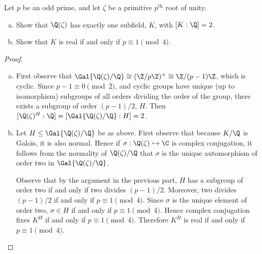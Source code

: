 \documentclass[10pt]{amsart}
\begin{document}
\begin{thm}
  Let $p$ be an odd prime, and let $\zeta$ be a primitive $p^\text{th}$ root of unity.
  \begin{enumerate}[(a)]
  \item
    Show that $\Q(\zeta)$ has exactly one subfield, $K$, with $[K : \Q] = 2$.
  \item
    Show that $K$ is real if and only if $p \equiv 1 \pmod{4}$.
  \end{enumerate}
  
  \begin{proof}
    \begin{enumerate}[(a)]
    \item
      First observe that $\Gal{\Q(\zeta)/\Q} \cong (\Z/p\Z)^\times \cong \Z/(p-1)\Z$, which is cyclic.
      Since $p - 1 \equiv 0 \pmod{2}$, and cyclic groups have unique (up to isomorphism) subgroups of all orders dividing the order of the group, there exists a subgroup of order $(p-1)/2$, $H$.
      Then $[\Q(\zeta)^H : \Q] = [\Gal{\Q(\zeta)/\Q} : H] = 2$.
    \item
      Let $H \leq \Gal{\Q(\zeta)/\Q}$ be as above.
      First observe that because $K/\Q$ is Galois, it is also normal.
      Hence if $\sigma : \Q(\zeta) \hookrightarrow \C$ is complex conjugation, it follows from the normality of $\Q(\zeta)/\Q$ that $\sigma$ is the unique automorphism of order two in $\Gal{\Q(\zeta)/\Q}$.
      
      Observe that by the argument in the previous part, $H$ has a subgroup of order two if and only if two divides $(p-1)/2$.
      Moreover, two divides $(p-1)/2$ if and only if $p \equiv 1 \pmod{4}$.
      Since $\sigma$ is the unique element of order two, $\sigma \in H$ if and only if $p \equiv 1 \pmod{4}$.
      Hence complex conjugation fixes $K^H$ if and only if $p \equiv 1 \pmod{4}$.
      Therefore $K^H$ is real if and only if $p \equiv 1 \pmod{4}$.
    \end{enumerate}
  \end{proof}
\end{thm}
\end{document}
